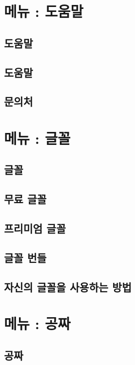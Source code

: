 \documentclass[12pt, a4paper, oneside]{book}
\let\stdsection\section
\renewcommand\section{\newpage\stdsection}
\begin{document}
	\chapter{메뉴 : 도움말} 
	\minitoc
\section{	도움말	}
\section{	도움말				}							
\section{	문의처				}							



	\chapter{메뉴 : 글꼴} 
	\minitoc
\section{	글꼴	}										
\section{	무료 글꼴				}							
\section{	프리미엄 글꼴				}							
\section{	글꼴 번들				}							
\section{	자신의 글꼴을 사용하는 방법				}							



	\chapter{메뉴 : 공짜} 
	\minitoc
\section{	공짜	}										
\end{document}
